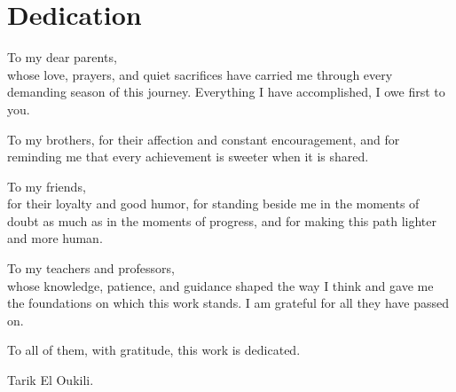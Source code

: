 \chapter*{Dedication}

  \begin{dedication}

    To my dear parents,\\
    whose love, prayers, and quiet sacrifices have carried me through every
    demanding season of this journey. Everything I have accomplished, I owe
    first to you.

    \par
    \vspace{1\baselineskip}

    To my brothers, %
    for their affection and constant encouragement, and for reminding me that
    every achievement is sweeter when it is shared.

    \par
    \vspace{1\baselineskip}

    To my friends,\\
    for their loyalty and good humor, for standing beside me in the moments of
    doubt as much as in the moments of progress, and for making this path
    lighter and more human.

    \par
 
    \vspace{1\baselineskip}

    To my teachers and professors,\\
    whose knowledge, patience, and guidance shaped the way I think and gave me the
    foundations on which this work stands. I am grateful for all they have passed
    on.

    \par

    \vspace{1\baselineskip}

    To all of them, with gratitude, this work is dedicated.

    \vspace{\baselineskip}
     Tarik El Oukili.
  \end{dedication}
